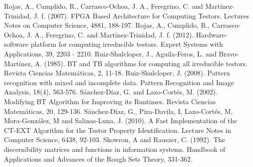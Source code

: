\documentclass[conference]{IEEEtran}
\begin{document}
\begin{thebibliography}{20}
Rojas, A., Cumplido, R., Carrasco-Ochoa, J. A., Feregrino, C. and Mart\'inez-Trinidad, J. f. (2007). FPGA Based Architecture for Computing Testors. Lectures Notes on Computer Science, 4881, 188-197.
Rojas, A., Cumplido, R., Carrasco-Ochoa, J. A., Feregrino, C. and Mart\'inez-Trinidad, J. f. (2012). Hardware-software platform for computing irreducible testors. Expert Systems with Applications, 39, 2203 - 2210.
Ruiz-Shulcloper, J., Aguila-Feros, L. and Bravo-Mart\'inez, A. (1985). BT and TB algorithms for computing all irreducible testors. Revista Ciencias Matem\'aticas, 2, 11-18.
Ruiz-Shulcloper, J. (2008). Pattern recognition with mixed and incomplete data. Pattern Recognition and Image Analysis, 18(4), 563-576.
S\'anchez-D\'iaz, G. and Lazo-Cort\'es, M. (2002). Modifying BT Algorithm for Improving its Runtimes. Revista Ciencias Matem\'aticas, 20, 129-136.
S\'anchez-D\'iaz, G., Piza-Davila, I, Lazo-Cort\'es, M, Mora-Gonz\'alez, M and Salinas-Luna, J. (2010). A Fast Implementation of the CT-EXT Algorithm for the Testor Property Identification. Lecture Notes in Computer Science, 6438, 92-103.
Skowron, A and Rauszer, C. (1992). The discernibility matrices and functions in information systems. Handbook of Applications and Advances of the Rough Sets Theory, 331-362.
\end{thebibliography}
\end{document}
